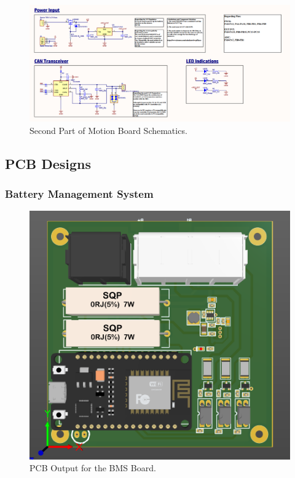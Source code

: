 \begin{figure}[h!]
	\centering
	\includegraphics[scale=0.1]{Figures/HW/schem-motor-2.png}
	\caption{Second Part of Motion Board Schematics.}
	\label{fig:hw-motion-schem-2}
\end{figure}
\newpage
\subsection{PCB Designs}

\subsubsection{Battery Management System}
\begin{figure}[h!]
	\centering
	\includegraphics[scale=0.1]{Figures/HW/pcb-bms.png}
	\caption{PCB Output for the BMS Board. }
	\label{fig:hw-bms-pcb}
\end{figure}


